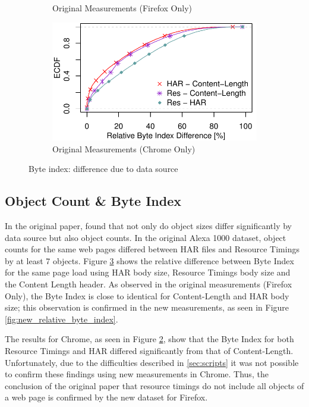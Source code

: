 \begin{figure}
\begin{subfigure}{\linewidth}
	\caption{Original Measurements (Firefox Only)}
	\label{fig:orig_firefox_relative_byte_index}
\end{subfigure}\par\medskip
 \begin{subfigure}{\linewidth}
		\includegraphics[width=\linewidth]{Chrome_Plots/ecdf_rel_object_byte_index.pdf}
	\caption{Original Measurements (Chrome Only)}
	\label{fig:orig_chrome_relative_byte_index}
\end{subfigure}
\caption{Byte index: difference due to data source}
\label{fig:relative_byte_index}
\end{figure}

\subsection{Object Count \& Byte Index}
In the original paper, \citeauthor{10.1007/978-3-030-15986-3_19} found that not only do object sizes differ significantly by data source but also object counts. In the original Alexa 1000 dataset, object counts for the same web pages differed between HAR files and Resource Timings by at least 7 objects. Figure \ref{fig:relative_byte_index} shows the relative difference between Byte Index for the same page load using HAR body size, Resource Timings body size and the Content Length header. As observed in the original measurements (Firefox Only), the Byte Index is close to identical for Content-Length and HAR body size; this observation is confirmed in the new measurements, as seen in Figure \ref{fig:new_relative_byte_index}. 

The results for Chrome, as seen in Figure \ref{fig:orig_chrome_relative_byte_index}, show that the Byte Index for both Resource Timings and HAR differed significantly from that of Content-Length. Unfortunately, due to the difficulties described in \ref{sec:scripts} it was not possible to confirm these findings using new measurements in Chrome. Thus, the conclusion of the original paper that resource timings do not include all objects of a web page is confirmed by the new dataset for Firefox.